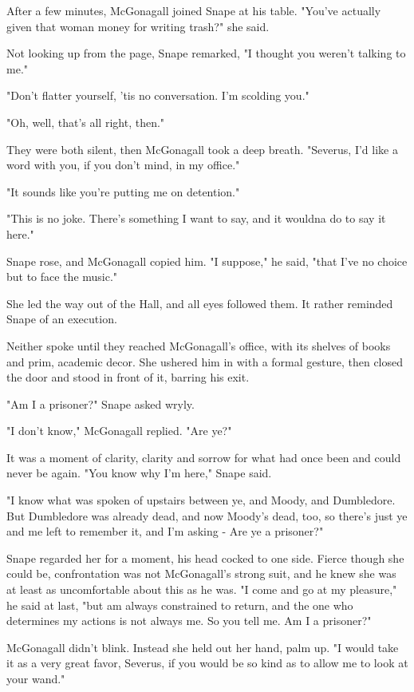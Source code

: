 After a few minutes, McGonagall joined Snape at his table. "You've actually given that woman money for writing trash?" she said.

Not looking up from the page, Snape remarked, "I thought you weren't talking to me."

"Don't flatter yourself, 'tis no conversation. I'm scolding you."

"Oh, well, that's all right, then."

They were both silent, then McGonagall took a deep breath. "Severus, I'd like a word with you, if you don't mind, in my office."

"It sounds like you're putting me on detention."

"This is no joke. There's something I want to say, and it wouldna do to say it here."

Snape rose, and McGonagall copied him. "I suppose," he said, "that I've no choice but to face the music."

She led the way out of the Hall, and all eyes followed them. It rather reminded Snape of an execution.

Neither spoke until they reached McGonagall's office, with its shelves of books and prim, academic decor. She ushered him in with a formal gesture, then closed the door and stood in front of it, barring his exit.

"Am I a prisoner?" Snape asked wryly.

"I don't know," McGonagall replied. "Are ye?"

It was a moment of clarity, clarity and sorrow for what had once been and could never be again. "You know why I'm here," Snape said.

"I know what was spoken of upstairs between ye, and Moody, and Dumbledore. But Dumbledore was already dead, and now Moody's dead, too, so there's just ye and me left to remember it, and I'm asking - Are ye a prisoner?"

Snape regarded her for a moment, his head cocked to one side. Fierce though she could be, confrontation was not McGonagall's strong suit, and he knew she was at least as uncomfortable about this as he was. "I come and go at my pleasure," he said at last, "but am always constrained to return, and the one who determines my actions is not always me. So you tell me. Am I a prisoner?"

McGonagall didn't blink. Instead she held out her hand, palm up. "I would take it as a very great favor, Severus, if you would be so kind as to allow me to look at your wand."

